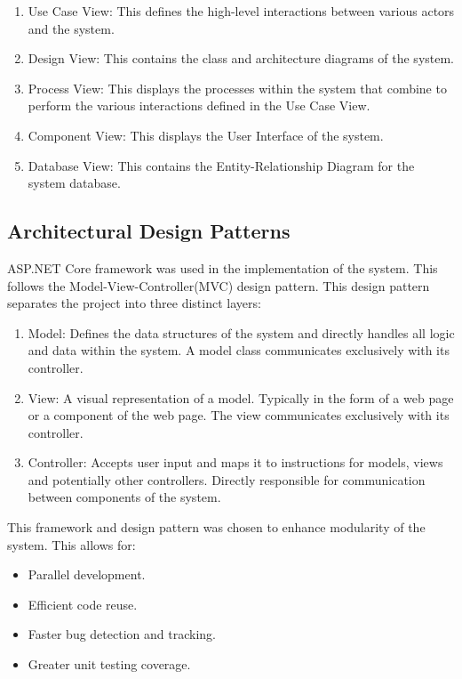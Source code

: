 \documentclass[11pt]{article}
\begin{document}
\begin{enumerate}
	\item Use Case View: This defines the high-level interactions between various actors and the system.
	\item Design View: This contains the class and architecture diagrams of the system.
	\item Process View: This displays the processes within the system that combine to perform the various interactions defined in the Use Case View.
	\item Component View: This displays the User Interface of the system.
	\item Database View: This contains the Entity-Relationship Diagram for the system database.
\end{enumerate} 
\subsection{Architectural Design Patterns}
ASP.NET Core framework was used in the implementation of the system. This follows the Model-View-Controller(MVC) design pattern. This design pattern separates the project into three distinct layers:

\begin{enumerate}
	\item Model: Defines the data structures of the system and directly handles all logic and data within the system. A model class communicates exclusively with its controller.
	\item View: A visual representation of a model. Typically in the form of a web page or a component of the web page. The view communicates exclusively with its controller.
	\item Controller: Accepts user input and maps it to instructions for models, views and potentially other controllers. Directly responsible for communication between components of the system.
	
	  
\end{enumerate} 

This framework and design pattern was chosen to enhance modularity of the system. This allows for: 
\begin{itemize}
	\item Parallel development.
	\item Efficient code reuse.
	\item Faster bug detection and tracking.
	\item Greater unit testing coverage.
	
\end{itemize} 
 
\end{document}

